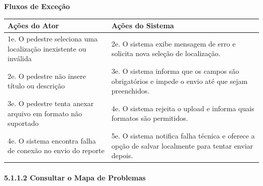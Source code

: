 \documentclass[12pt,a4paper]{article}
\begin{document}
\textbf{Fluxos de Exceção}

\begin{longtable}{|>{\raggedright\arraybackslash}p{7cm}|>{\raggedright\arraybackslash}p{7cm}|}
\hline
\textbf{Ações do Ator} & \textbf{Ações do Sistema} \\
\hline
1e. O pedestre seleciona uma localização inexistente ou inválida & 2e. O sistema exibe mensagem de erro e solicita nova seleção de localização. \\
\hline
2e. O pedestre não insere título ou descrição & 3e. O sistema informa que os campos são obrigatórios e impede o envio até que sejam preenchidos. \\
\hline
3e. O pedestre tenta anexar arquivo em formato não suportado & 4e. O sistema rejeita o upload e informa quais formatos são permitidos. \\
\hline
4e. O sistema encontra falha de conexão no envio do reporte & 5e. O sistema notifica falha técnica e oferece a opção de salvar localmente para tentar enviar depois. \\
\hline
\end{longtable}

\paragraph{5.1.1.2 Consultar o Mapa de Problemas}
\end{document}
